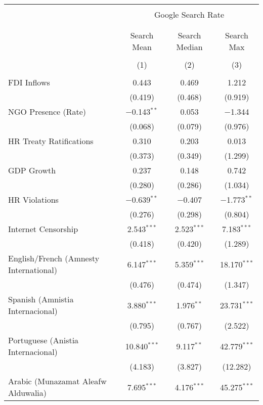 
\begin{table}[!htbp] \centering 
  \caption{} 
  \label{} 
\begin{tabular}{@{\extracolsep{5pt}}lccc} 
\\[-1.8ex]\hline 
\hline \\[-1.8ex] 
 & \multicolumn{3}{c}{Google Search Rate} \\ 
\cline{2-4} 
\\[-1.8ex] & \multicolumn{3}{c}{ } \\ 
 & Search Mean & Search Median & Search Max \\ 
\\[-1.8ex] & (1) & (2) & (3)\\ 
\hline \\[-1.8ex] 
 FDI Inflows & 0.443 & 0.469 & 1.212 \\ 
  & (0.419) & (0.468) & (0.919) \\ 
  NGO Presence (Rate) & $-$0.143$^{**}$ & 0.053 & $-$1.344 \\ 
  & (0.068) & (0.079) & (0.976) \\ 
  HR Treaty Ratifications & 0.310 & 0.203 & 0.013 \\ 
  & (0.373) & (0.349) & (1.299) \\ 
  GDP Growth & 0.237 & 0.148 & 0.742 \\ 
  & (0.280) & (0.286) & (1.034) \\ 
  HR Violations & $-$0.639$^{**}$ & $-$0.407 & $-$1.773$^{**}$ \\ 
  & (0.276) & (0.298) & (0.804) \\ 
  Internet Censorship & 2.543$^{***}$ & 2.523$^{***}$ & 7.183$^{***}$ \\ 
  & (0.418) & (0.420) & (1.289) \\ 
  English/French (Amnesty International) & 6.147$^{***}$ & 5.359$^{***}$ & 18.170$^{***}$ \\ 
  & (0.476) & (0.474) & (1.347) \\ 
  Spanish (Amnistia Internacional) & 3.880$^{***}$ & 1.976$^{**}$ & 23.731$^{***}$ \\ 
  & (0.795) & (0.767) & (2.522) \\ 
  Portuguese (Anistia Internacional) & 10.840$^{***}$ & 9.117$^{**}$ & 42.779$^{***}$ \\ 
  & (4.183) & (3.827) & (12.282) \\ 
  Arabic (Munazamat Aleafw Alduwalia) & 7.695$^{***}$ & 4.176$^{***}$ & 45.275$^{***}$ \\ 

\end{tabular}
\end{table}
